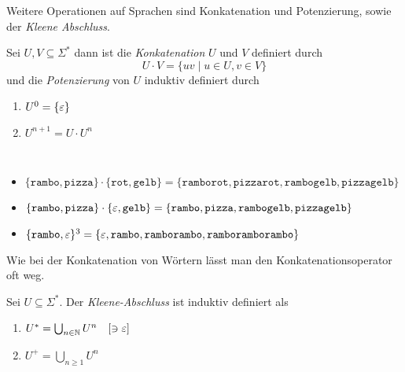 Weitere Operationen auf Sprachen sind Konkatenation und Potenzierung, sowie der \emph{Kleene Abschluss}.
\begin{Def} %
	Sei $U,V\subseteq \Sigma^*$ dann ist die \emph{Konkatenation} $U$ und $V$ definiert durch
	\[ U\cdot V = \{uv \mid u\in U, v\in V \} \]
  und die \emph{Potenzierung} von $U$ induktiv definiert durch
  \begin{enumerate}
  \item $U^0 = \{\varepsilon\}$
  \item $U^{n+1} = U \cdot U^{n}$
  \end{enumerate}
\end{Def}
\begin{Bsp*}~
  \begin{itemize}
  \item $\{\mathtt{rambo}, \mathtt{pizza}\} \cdot \{\mathtt{rot}, \mathtt{gelb}\} = \{\mathtt{ramborot}, \mathtt{pizzarot}, \mathtt{rambogelb}, \mathtt{pizzagelb}\}$
  \item $\{\mathtt{rambo}, \mathtt{pizza}\} \cdot \{\varepsilon, \mathtt{gelb}\} = \{\mathtt{rambo}, \mathtt{pizza}, \mathtt{rambogelb}, \mathtt{pizzagelb}\}$
  \item $\{\mathtt{rambo, \varepsilon}\}^3 = \{\mathtt{\varepsilon}, \mathtt{rambo}, \mathtt{ramborambo}, \mathtt{ramboramborambo}\}$
  \end{itemize}
\end{Bsp*}
Wie bei der Konkatenation von Wörtern lässt man den Konkatenationsoperator oft weg.
%
\begin{Def}
	Sei $U\subseteq\Sigma^*$.
  Der \emph{Kleene-Abschluss} ist induktiv definiert als
  \begin{enumerate}
  \item 
    $U^* = \bigcup_{n\in\mathbb{N}} U^n \quad [\ni\varepsilon]$
  \item
		$U^+ = \bigcup_{n\ge1} U^n$
  \end{enumerate}
\end{Def}

